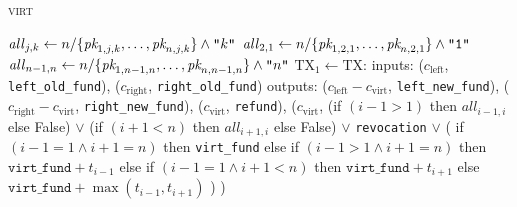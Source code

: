 \begin{center}
\begin{processbox}{\textsc{virt}}
\begin{algorithmic}[1]
          \State $\mathit{all}_{j, k} \gets n/\{\textit{pk}_{1, j, k}, \dots, \textit{pk}_{n, j,
          k}\} \wedge \texttt{"}k\texttt{"}$
        \EndFor
          \State $\mathit{all}_{2, 1} \gets n/\{\textit{pk}_{1, 2, 1}, \dots, \textit{pk}_{n, 2,
          1}\} \wedge \texttt{"1"}$
        \EndIf
          \State $\mathit{all}_{n-1, n} \gets n/\{\textit{pk}_{1, n-1, n}, \dots, \textit{pk}_{n,
          n-1, n}\} \wedge \texttt{"}n\texttt{"}$
        \EndIf
        \State {}
        \State {}
        \State $\mathrm{TX}_1 \gets \mathrm{TX}$:
        \Indent
          \State inputs:
          \Indent
            \State ($c_{\mathrm{left}}$, \texttt{left\_old\_fund}),
            \State ($c_{\mathrm{right}}$, \texttt{right\_old\_fund})
          \EndIndent
          \State outputs:
          \Indent
            \State ($c_{\mathrm{left}} - c_{\mathrm{virt}}$,
            \texttt{left\_new\_fund}),
            \label{code:virtual-layer:mid-txs:initiator:left-new-fund}
            \State ($c_{\mathrm{right}} - c_{\mathrm{virt}}$,
            \texttt{right\_new\_fund}),
            \State ($c_{\mathrm{virt}}$, \texttt{refund}),
            \State ($c_{\mathrm{virt}}$,
            \Indent
              \State (if $(i-1 > 1)$ then $\mathit{all}_{i-1, i}$ else False)
              \label{code:virtual-layer:mid-txs:initiator:left-all}
              \State $\vee$ (if $(i+1 < n)$ then $\mathit{all}_{i+1, i}$ else
              False)
              \label{code:virtual-layer:mid-txs:initiator:right-all}
              \State $\vee$ \texttt{revocation}
              \State $\vee$ (
              \Indent
                \State if $(i-1 = 1 \wedge i+1 = n)$ then \texttt{virt\_fund}
                \label{code:virtual-layer:mid-txs:initiator:i-is-2:n-is-3}
                \State else if $(i-1 > 1 \wedge i+1 = n)$ then
                $\texttt{virt\_fund} + t_{i-1}$
                \State else if $(i-1 = 1 \wedge i+1 < n)$ then
                $\texttt{virt\_fund} + t_{i+1}$
                \State else 
                $\texttt{virt\_fund} + \max{(t_{i-1}, t_{i+1})}$
              \EndIndent
              \State )
            \EndIndent
            \State )
            \label{code:virtual-layer:mid-txs:initiator:virt-out}
          \EndIndent
        \EndIndent


\end{algorithmic}
\end{processbox}
\end{center}
